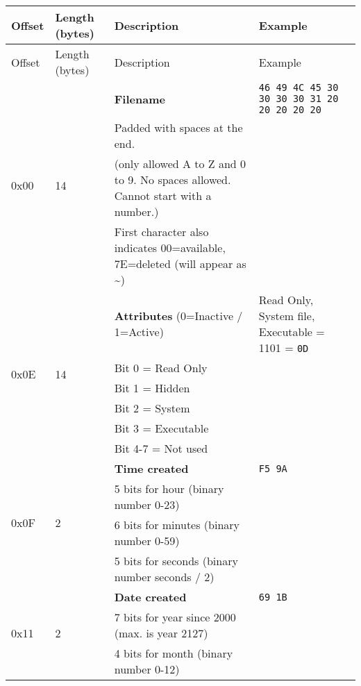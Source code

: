 \documentclass[a4paper,11pt]{article}
\begin{document}
        \begin{longtable}{ |m{1cm}|m{1.3cm}|m{6.8cm}|m{2.7cm}| }
            \hline
            \rowcolor{lightgray}
            Offset & Length (bytes) & Description & Example\\
            \hline
            \endfirsthead

            \hline
            \rowcolor{lightgray}
            Offset & Length (bytes) & Description & Example\\
            \hline
            \endhead

            \multirow{4}{4em}{0x00} & \multirow{4}{4em}{14} & \textbf{Filename}
            & \texttt{46 49 4C 45 30 30 30 30 31 20 20 20 20 20}\\
            & & Padded with spaces at the end. &\\
            & & (only allowed A to Z and 0 to 9. No spaces allowed. Cannot start
            with a number.) &\\
            & & First character also indicates 00=available, 7E=deleted (will
            appear as \textasciitilde) &\\
            \hline
            \multirow{6}{4em}{0x0E} & \multirow{6}{4em}{14} & \textbf{Attributes} (0=Inactive / 1=Active) 
            & Read Only, System file, Executable = 1101 = \texttt{0D}\\
            & & Bit 0 = Read Only &\\
            & & Bit 1 = Hidden &\\
            & & Bit 2 = System &\\
            & & Bit 3 = Executable &\\
            & & Bit 4-7 = Not used &\\
            \hline
            \multirow{4}{4em}{0x0F} & \multirow{4}{4em}{2} & \textbf{Time created}
            & \texttt{F5 9A}\\
            & & 5 bits for hour (binary number 0-23) &\\
            & & 6 bits for minutes (binary number 0-59) &\\
            & & 5 bits for seconds (binary number seconds / 2) &\\
            \hline
            \multirow{4}{4em}{0x11} & \multirow{4}{4em}{2} & \textbf{Date created}
            & \texttt{69 1B}\\
            & & 7 bits for year since 2000 (max. is year 2127) &\\
            & & 4 bits for month (binary number 0-12) &\\

\end{longtable}
\end{document}
